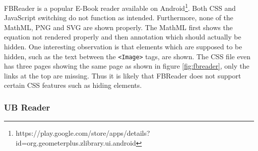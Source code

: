 FBReader is a popular E-Book reader available on Android\footnote{https://play.google.com/store/apps/details?id=org.geometerplus.zlibrary.ui.android}. Both CSS and JavaScript switching do not function as intended. Furthermore, none of the MathML, PNG and SVG are shown properly. The MathML first shows the equation not rendered properly and then annotation which should actually be hidden. One interesting observation is that elements which are supposed to be hidden, such as the text between the \lstinline|<Image>| tags, are shown. The CSS file even has three pages showing the same page as shown in figure \ref{fig:fbreader}, only the links at the top are missing. Thus it is likely that FBReader does not support certain CSS features such as hiding elements.

\subsubsection{UB Reader}

